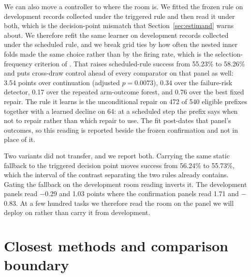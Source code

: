We can also move a controller to where the room is. We fitted the frozen rule on development records collected under the triggered rule and then read it under both, which is the decision-point mismatch that Section~\ref{sec:estimand} warns about. We therefore refit the same learner on development records collected under the scheduled rule, and we break grid ties by how often the nested inner folds made the same choice rather than by the firing rate, which is the selection-frequency criterion of \citet{meinshausen2010stability}. That raises scheduled-rule success from 55.23\% to 58.26\% and puts cross-draw control ahead of every comparator on that panel as well: 3.54 points over continuation (adjusted $p=0.0073$), 0.34 over the failure-risk detector, 0.17 over the repeated arm-outcome forest, and 0.76 over the best fixed repair. The rule it learns is the unconditional repair on 472 of 540 eligible prefixes together with a learned decline on 64: at a scheduled step the prefix says when not to repair rather than which repair to use. The fit post-dates that panel's outcomes, so this reading is reported beside the frozen confirmation and not in place of it.

Two variants did not transfer, and we report both. Carrying the same static fallback to the triggered decision point moves success from 56.24\% to 55.73\%, which the interval of the contrast separating the two rules already contains. Gating the fallback on the development room reading inverts it. The development panels read $-$0.29 and 1.03 points where the confirmation panels read 1.71 and $-$0.83. At a few hundred tasks we therefore read the room on the panel we will deploy on rather than carry it from development.


\section{Closest methods and comparison boundary}

